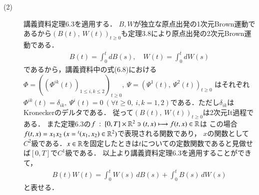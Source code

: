 \begin{description}
	\item[(2)] 講義資料定理6.3を適用する．
		$B,W$が独立な原点出発の1次元Brown運動であるから$(B(t),\ W(t))_{t \geq 0}$も定理3.8により原点出発の2次元Brown運動である．
		\begin{align}
			B(t) = \int_{0}^{t} dB(s), \quad W(t) = \int_{0}^{t} dW(s)
		\end{align}
		であるから，講義資料中の式(6.8)における$\Phi = ((\Phi^{ik}(t))_{1 \leq i, k \leq 2})_{t \geq 0},\ \Psi = (\Psi^1(t),\ \Psi^2(t))_{t \geq 0}$
		はそれぞれ$\Phi^{ik}(t) = \delta_{ik},\ \Psi^i(t) = 0\ (\forall t \geq 0,\ i,k=1,2)$である．ただし$\delta_{ik}$はKroneckerのデルタである．
		従って$(B(t),\ W(t))_{t \geq 0}$は2次元It過程である．
		また定理6.3の$f\ :\ [0, T] \times \mathbb{R}^2 \ni (t,x) \longmapsto f(t,x) \in \mathbb{R}$は
		この場合$f(t,x) = x_1 x_2\ (x = {}^t(x_1, x_2) \in \mathbb{R}^2)$で表現される関数であり，
		$x$の関数として$C^2$級である．$x \in \mathbb{R}$を固定したときは$t$についての定数関数であると見做せば$[0, T]$で$C^1$級である．
		以上より講義資料定理6.3を適用することができて，
		\begin{align}
			B(t)W(t) = \int_{0}^{t} W(s)\, dB(s) + \int_{0}^{t} B(s)\, dW(s)  
		\end{align}
		と表せる．
	

\end{description}
